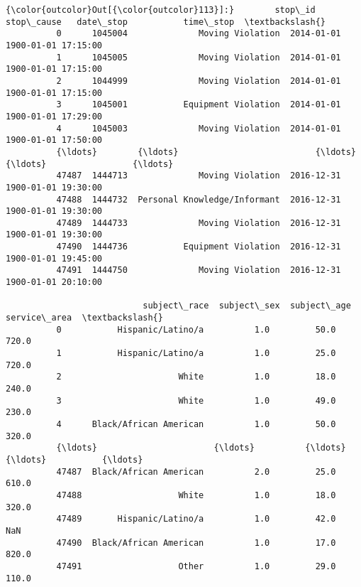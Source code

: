 \documentclass[11pt]{article}
\begin{document}
\begin{Verbatim}[commandchars=\\\{\}]
{\color{outcolor}Out[{\color{outcolor}113}]:}        stop\_id                    stop\_cause   date\_stop           time\_stop  \textbackslash{}
          0      1045004              Moving Violation  2014-01-01 1900-01-01 17:15:00   
          1      1045005              Moving Violation  2014-01-01 1900-01-01 17:15:00   
          2      1044999              Moving Violation  2014-01-01 1900-01-01 17:15:00   
          3      1045001           Equipment Violation  2014-01-01 1900-01-01 17:29:00   
          4      1045003              Moving Violation  2014-01-01 1900-01-01 17:50:00   
          {\ldots}        {\ldots}                           {\ldots}         {\ldots}                 {\ldots}   
          47487  1444713              Moving Violation  2016-12-31 1900-01-01 19:30:00   
          47488  1444732  Personal Knowledge/Informant  2016-12-31 1900-01-01 19:30:00   
          47489  1444733              Moving Violation  2016-12-31 1900-01-01 19:30:00   
          47490  1444736           Equipment Violation  2016-12-31 1900-01-01 19:45:00   
          47491  1444750              Moving Violation  2016-12-31 1900-01-01 20:10:00   
          
                           subject\_race  subject\_sex  subject\_age  service\_area  \textbackslash{}
          0           Hispanic/Latino/a          1.0         50.0         720.0   
          1           Hispanic/Latino/a          1.0         25.0         720.0   
          2                       White          1.0         18.0         240.0   
          3                       White          1.0         49.0         230.0   
          4      Black/African American          1.0         50.0         320.0   
          {\ldots}                       {\ldots}          {\ldots}          {\ldots}           {\ldots}   
          47487  Black/African American          2.0         25.0         610.0   
          47488                   White          1.0         18.0         320.0   
          47489       Hispanic/Latino/a          1.0         42.0           NaN   
          47490  Black/African American          1.0         17.0         820.0   
          47491                   Other          1.0         29.0         110.0   
          

\end{Verbatim}
\end{document}
